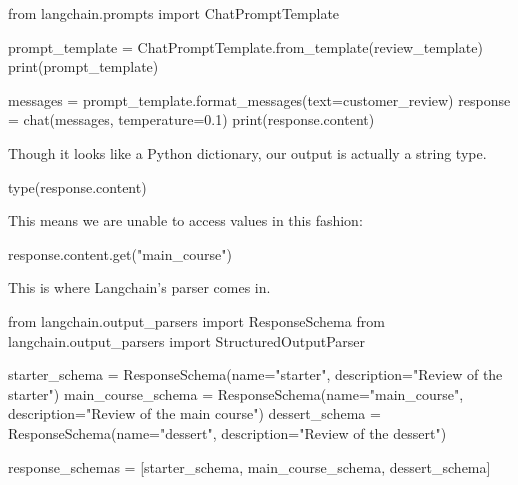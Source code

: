 \documentclass[
  letterpaper,
  DIV=11,
  numbers=noendperiod]{scrreprt}
\newenvironment{Shaded}{\begin{snugshade}}{\end{snugshade}}
\newcommand{\BuiltInTok}[1]{\textcolor[rgb]{0.00,0.23,0.31}{#1}}
\newcommand{\FloatTok}[1]{\textcolor[rgb]{0.68,0.00,0.00}{#1}}
\newcommand{\ImportTok}[1]{\textcolor[rgb]{0.00,0.46,0.62}{#1}}
\newcommand{\NormalTok}[1]{\textcolor[rgb]{0.00,0.23,0.31}{#1}}
\newcommand{\OperatorTok}[1]{\textcolor[rgb]{0.37,0.37,0.37}{#1}}
\newcommand{\StringTok}[1]{\textcolor[rgb]{0.13,0.47,0.30}{#1}}
\begin{document}
\begin{Shaded}
\begin{Highlighting}[]
\ImportTok{from}\NormalTok{ langchain.prompts }\ImportTok{import}\NormalTok{ ChatPromptTemplate}

\NormalTok{prompt\_template }\OperatorTok{=}\NormalTok{ ChatPromptTemplate.from\_template(review\_template)}
\BuiltInTok{print}\NormalTok{(prompt\_template)}
\end{Highlighting}
\end{Shaded}

\begin{Shaded}
\begin{Highlighting}[]
\NormalTok{messages }\OperatorTok{=}\NormalTok{ prompt\_template.format\_messages(text}\OperatorTok{=}\NormalTok{customer\_review)}
\NormalTok{response }\OperatorTok{=}\NormalTok{ chat(messages, temperature}\OperatorTok{=}\FloatTok{0.1}\NormalTok{)}
\BuiltInTok{print}\NormalTok{(response.content)}
\end{Highlighting}
\end{Shaded}

Though it looks like a Python dictionary, our output is actually a
string type.

\begin{Shaded}
\begin{Highlighting}[]
\BuiltInTok{type}\NormalTok{(response.content)}
\end{Highlighting}
\end{Shaded}

This means we are unable to access values in this fashion:

\begin{Shaded}
\begin{Highlighting}[]
\NormalTok{response.content.get(}\StringTok{"main\_course"}\NormalTok{)}
\end{Highlighting}
\end{Shaded}

This is where Langchain's parser comes in.

\begin{Shaded}
\begin{Highlighting}[]
\ImportTok{from}\NormalTok{ langchain.output\_parsers }\ImportTok{import}\NormalTok{ ResponseSchema}
\ImportTok{from}\NormalTok{ langchain.output\_parsers }\ImportTok{import}\NormalTok{ StructuredOutputParser}

\NormalTok{starter\_schema }\OperatorTok{=}\NormalTok{ ResponseSchema(name}\OperatorTok{=}\StringTok{"starter"}\NormalTok{, description}\OperatorTok{=}\StringTok{"Review of the starter"}\NormalTok{)}
\NormalTok{main\_course\_schema }\OperatorTok{=}\NormalTok{ ResponseSchema(name}\OperatorTok{=}\StringTok{"main\_course"}\NormalTok{, description}\OperatorTok{=}\StringTok{"Review of the main course"}\NormalTok{)}
\NormalTok{dessert\_schema }\OperatorTok{=}\NormalTok{ ResponseSchema(name}\OperatorTok{=}\StringTok{"dessert"}\NormalTok{, description}\OperatorTok{=}\StringTok{"Review of the dessert"}\NormalTok{)}

\NormalTok{response\_schemas }\OperatorTok{=}\NormalTok{ [starter\_schema, main\_course\_schema, dessert\_schema]}
\end{Highlighting}
\end{Shaded}
\end{document}
